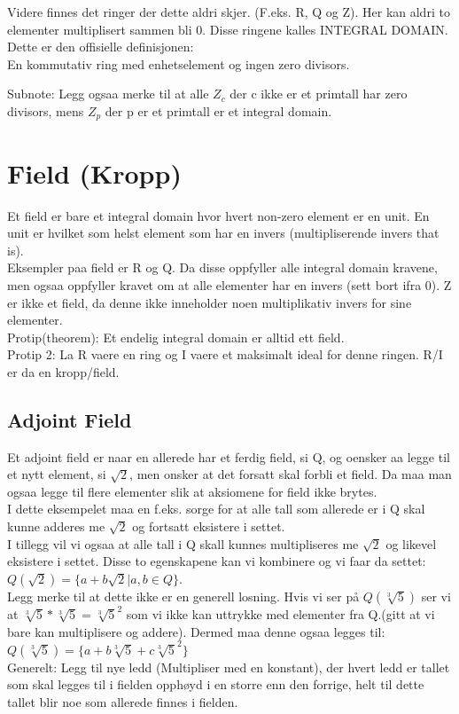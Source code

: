 \documentclass[12pt,a4paper]{article}
\begin{document}
Videre finnes det ringer der dette aldri skjer. (F.eks. R, Q og Z). Her kan aldri to elementer multiplisert sammen bli 0. Disse ringene kalles INTEGRAL DOMAIN. Dette er den offisielle definisjonen:\\
En kommutativ ring med enhetselement og ingen zero divisors.

Subnote: Legg ogsaa merke til at alle $Z_c$ der c ikke er et primtall har zero divisors, mens $Z_p$ der p er et primtall er et integral domain. 

\section*{Field (Kropp)}
Et field er bare et integral domain hvor hvert non-zero element er en unit. En unit er hvilket som helst element som har en invers (multipliserende invers that is). \\
Eksempler paa field er R og Q. Da disse oppfyller alle integral domain kravene, men ogsaa oppfyller kravet om at alle elementer har en invers (sett bort ifra 0). Z er ikke et field, da denne ikke inneholder noen multiplikativ invers for sine elementer. \\

Protip(theorem): Et endelig integral domain er alltid ett field. \\
Protip 2: La R vaere en ring og I vaere et maksimalt ideal for denne ringen. R/I er da en kropp/field. 

\subsection*{Adjoint Field}
Et adjoint field er naar en allerede har et ferdig field, si Q, og oensker aa legge til et nytt element, si $\sqrt{2}$, men onsker at det forsatt skal forbli et field. Da maa man ogsaa legge til flere elementer slik at aksiomene for field ikke brytes.\\
I dette eksempelet maa en f.eks. sorge for at alle tall som allerede er i Q skal kunne adderes me $\sqrt{2}$ og fortsatt eksistere i settet.\\
I tillegg vil vi ogsaa at alle tall i Q skall kunnes multipliseres me $\sqrt{2}$ og likevel eksistere i settet. Disse to egenskapene kan vi kombinere og vi faar da settet:\\
$Q(\sqrt{2}) = \{a + b\sqrt{2} | a,b \in Q\}$.\\
Legg merke til at dette ikke er en generell losning. Hvis vi ser på $Q(\sqrt[3]{5})$ ser vi at $\sqrt[3]{5} * \sqrt[3]{5} = \sqrt[3]{5} ^ 2 $ som vi ikke kan uttrykke med elementer fra Q.(gitt at vi bare kan multiplisere og addere). Dermed maa denne ogsaa legges til:\\
$Q(\sqrt[3]{5}) = \{a+b\sqrt[3]{5} + c \sqrt[3]{5}^2\}$  \\
Generelt: Legg til nye ledd (Multipliser med en konstant), der hvert ledd er tallet som skal legges til i fielden opphøyd i en storre enn den forrige, helt til dette tallet blir noe som allerede finnes i fielden. 
\end{document}
